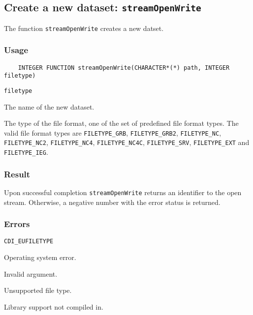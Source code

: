 

\subsection{Create a new dataset: {\tt streamOpenWrite}}
\label{streamOpenWrite}

The function {\tt streamOpenWrite} creates a new datset.
\subsubsection*{Usage}

\begin{verbatim}
    INTEGER FUNCTION streamOpenWrite(CHARACTER*(*) path, INTEGER filetype)
\end{verbatim}

\hspace*{4mm}\begin{minipage}[]{15cm}
\begin{deflist}{\tt filetype\ }
\item[{\tt path}]
The name of the new dataset.
\item[{\tt filetype}]
The type of the file format, one of the set of predefined {\CDI} file format types.
                     The valid {\CDI} file format types are {\tt FILETYPE\_GRB}, {\tt FILETYPE\_GRB2}, {\tt FILETYPE\_NC},
                     {\tt FILETYPE\_NC2}, {\tt FILETYPE\_NC4}, {\tt FILETYPE\_NC4C}, {\tt FILETYPE\_SRV},
                     {\tt FILETYPE\_EXT} and {\tt FILETYPE\_IEG}.

\end{deflist}
\end{minipage}

\subsubsection*{Result}

Upon successful completion {\tt streamOpenWrite} returns an identifier to the
open stream. Otherwise, a negative number with the error status is returned.


\subsubsection*{Errors}


\hspace*{4mm}\begin{minipage}[]{15cm}
\begin{deflist}{\tt CDI\_EUFILETYPE\ }
\item[{\tt CDI\_ESYSTEM}]
Operating system error.
\item[{\tt CDI\_EINVAL}]
Invalid argument.
\item[{\tt CDI\_EUFILETYPE}]
Unsupported file type.
\item[{\tt CDI\_ELIBNAVAIL}]
Library support not compiled in.
\end{deflist}
\end{minipage}


